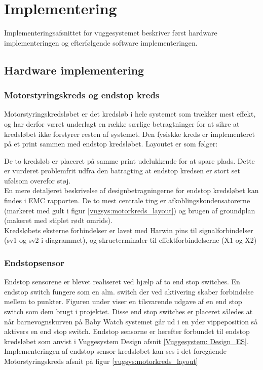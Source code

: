 \section{Implementering}
\label{Vuggesystem: Implementering} 
Implementeringsafsnittet for vuggesystemet beskriver først hardware implementeringen og efterfølgende software implementeringen.
\subsection{Hardware implementering}
\subsubsection{Motorstyringskreds og endstop kreds}
Motorstyringskredsløbet er det kredsløb i hele systemet som trækker mest effekt, og har derfor været underlagt en række særlige betragtninger for at sikre at kredsløbet ikke forstyrer resten af systemet. Den fysiskke kreds er implementeret på et print sammen med endstop kredsløbet. Layoutet er som følger:


De to kredsløb er placeret på samme print udelukkende for at spare plads. Dette er vurderet problemfrit udfra den batragting at endstop kredsen er stort set ufølsom overefor støj.\\

En mere detaljeret beskrivelse af designbetragningerne for endstop kredsløbet kan findes i EMC rapporten. De to mest centrale ting er afkoblingskondensatorerne (markeret med gult i figur \ref{vugsys:motorkreds_layout}) og brugen af groundplan (makeret med stiplet rødt omrids). \\

Kredsløbets eksterne forbindelser er lavet med Harwin pins til signalforbindelser (sv1 og sv2 i diagrammet), og skrueterminaler til effektforbindelserne (X1 og X2)

\newpage
\subsubsection{Endstopsensor}\label{Vuggesystem: Implementering_ES} 
Endstop sensorene er blevet realiseret ved hjælp af to end stop switches. En endstop switch fungere som en alm. switch der ved aktivering skaber forbindelse mellem to punkter. Figuren under viser en tilsvarende udgave af en end stop switch som dem brugt i projektet.
 Disse end stop switches er placeret således at når barnevognskurven på Baby Watch systemet går ud i en yder vippeposition så aktivers en end stop switch.
Endstop sensorne er herefter forbundet til endstop kredsløbet som anvist i Vuggesystem Design afsnit \vref{Vuggesystem: Design_ES}. \\
Implementeringen af endstop sensor kredsløbet kan ses i det foregående Motorstyringskreds afsnit på figur \vref{vugsys:motorkreds_layout}
\newpage
